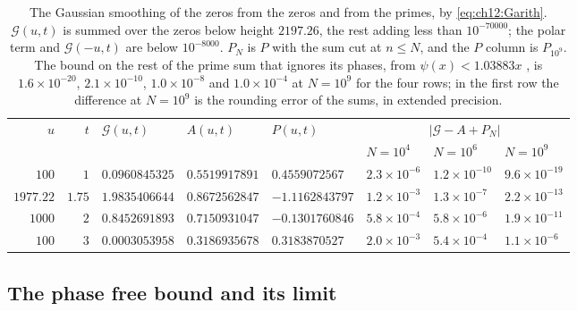\begin{table}[htbp]
\centering\footnotesize\setlength{\tabcolsep}{2.5pt}
\begin{tabular}{@{}rrllllll@{}}
\toprule
$u$ & $t$ & $\mathcal G(u,t)$ & $A(u,t)$ & $P(u,t)$ & \multicolumn{3}{c}{$|\mathcal G-A+P_N|$}\\
& & & & & $N=10^4$ & $N=10^6$ & $N=10^9$\\
\midrule
$100$ & $1$ & $0.0960845325$ & $0.5519917891$ & $0.4559072567$ & $2.3\times10^{-6}$ & $1.2\times10^{-10}$ & $9.6\times10^{-19}$\\
$1977.22$ & $1.75$ & $1.9835406644$ & $0.8672562847$ & $-1.1162843797$ & $1.2\times10^{-3}$ & $1.3\times10^{-7}$ & $2.2\times10^{-13}$\\
$1000$ & $2$ & $0.8452691893$ & $0.7150931047$ & $-0.1301760846$ & $5.8\times10^{-4}$ & $5.8\times10^{-6}$ & $1.9\times10^{-11}$\\
$100$ & $3$ & $0.0003053958$ & $0.3186935678$ & $0.3183870527$ & $2.0\times10^{-3}$ & $5.4\times10^{-4}$ & $1.1\times10^{-6}$\\
\bottomrule
\end{tabular}
\caption{The Gaussian smoothing of the zeros from the zeros and from the primes, by \eqref{eq:ch12:Garith}. $\mathcal G(u,t)$ is summed over the zeros below height $2197.26$, the rest adding less than $10^{-70000}$; the polar term and $\mathcal G(-u,t)$ are below $10^{-8000}$. $P_N$ is $P$ with the sum cut at $n\le N$, and the $P$ column is $P_{10^9}$. The bound on the rest of the prime sum that ignores its phases, from $\psi(x)<1.03883x$ \cite[Theorem 12]{RS62}, is $1.6\times10^{-20}$, $2.1\times10^{-10}$, $1.0\times10^{-8}$ and $1.0\times10^{-4}$ at $N=10^9$ for the four rows; in the first row the difference at $N=10^9$ is the rounding error of the sums, in extended precision.}
\label{tab:ch12:gweil}
\end{table}

\subsection{The phase free bound and its limit}\label{sec:ch12:phasefree}

